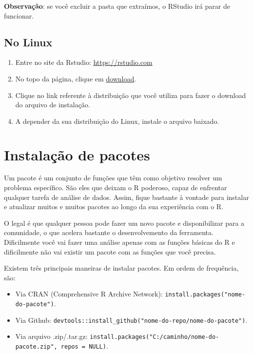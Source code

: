 \documentclass[
]{book}
\providecommand{\tightlist}{%
  \setlength{\itemsep}{0pt}\setlength{\parskip}{0pt}}
\begin{document}
\textbf{Observação}: se você excluir a pasta que extraímos, o RStudio irá parar de funcionar.

\hypertarget{no-linux-1}{%
\subsection{No Linux}\label{no-linux-1}}

\begin{enumerate}
\def\labelenumi{\arabic{enumi}.}
\item
  Entre no site da Rstudio: \url{https://rstudio.com}
\item
  No topo da página, clique em \href{https://rstudio.com/products/rstudio/download/}{download}.
\item
  Clique no link referente à distribuição que você utiliza para fazer o download do arquivo de instalação.
\item
  A depender da sua distribuição do Linux, instale o arquivo baixado.
\end{enumerate}

\hypertarget{instalauxe7uxe3o-de-pacotes}{%
\section{Instalação de pacotes}\label{instalauxe7uxe3o-de-pacotes}}

Um pacote é um conjunto de funções que têm como objetivo resolver um problema específico. São eles que deixam o R poderoso, capaz de enfrentar qualquer tarefa de análise de dados. Assim, fique bastante à vontade para instalar e atualizar muitos e muitos pacotes ao longo da sua experiência com o R.

O legal é que qualquer pessoa pode fazer um novo pacote e disponibilizar para a comunidade, o que acelera bastante o desenvolvemento da ferramenta. Dificilmente você vai fazer uma análise apenas com as funções básicas do R e dificilmente não vai existir um pacote com as funções que você precisa.

Existem três principais maneiras de instalar pacotes. Em ordem de frequência, são:

\begin{itemize}
\tightlist
\item
  Via CRAN (Comprehensive R Archive Network): \texttt{install.packages("nome-do-pacote")}.
\item
  Via Github: \texttt{devtools::install\_github("nome-do-repo/nome-do-pacote")}.
\item
  Via arquivo .zip/.tar.gz: \texttt{install.packages("C:/caminho/nome-do-pacote.zip",\ repos\ =\ NULL)}.
\end{itemize}
\end{document}
